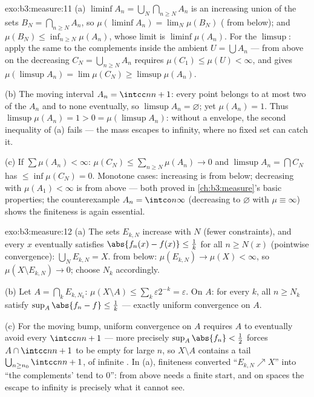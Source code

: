 \begin{solution}{exo:b3:measure:11}
(a) $\liminf A_n = \bigcup_N\bigcap_{n\geq N}A_n$ is an
increasing union of the sets $B_N = \bigcap_{n\geq N}A_n$,
so $\mu(\liminf A_n) = \lim_N\mu(B_N)$ ( from
below); and $\mu(B_N) \leq \inf_{n \geq N}\mu(A_n)$, whose
limit is $\liminf\mu(A_n)$. For the $\limsup$: apply the
same to the complements inside the  ambient
$U = \bigcup A_n$ ---  from above on the
decreasing $C_N = \bigcup_{n\geq N}A_n$ requires $\mu(C_1)
\leq \mu(U) < \infty$, and gives $\mu(\limsup A_n) =
\lim\mu(C_N) \geq \limsup\mu(A_n)$.

(b) The moving interval $A_n = \intcc n{n+1}$: every point
belongs to at most two of the $A_n$ and to none eventually,
so $\limsup A_n = \varnothing$; yet $\mu(A_n) = 1$. Thus
$\limsup\mu(A_n) = 1 > 0 = \mu(\limsup A_n)$: without a
 envelope, the second inequality of (a) fails
--- the mass escapes to infinity, where no fixed set can
catch it.

(c) If $\sum\mu(A_n) < \infty$: $\mu(C_N) \leq
\sum_{n\geq N}\mu(A_n) \to 0$ and $\limsup A_n =
\bigcap C_N$ has  $\leq \inf\mu(C_N) = 0$. Monotone
cases: increasing is  from below; decreasing with
$\mu(A_1) < \infty$ is  from above ---
both proved in \cref{ch:b3:measure}'s basic properties; the
counterexample $A_n = \intco n\infty$ (decreasing to
$\varnothing$ with $\mu \equiv \infty$) shows the finiteness
is again essential.
\end{solution}

\begin{solution}{exo:b3:measure:12}
(a) The sets $E_{k,N}$ increase with $N$ (fewer
constraints), and every $x$ eventually satisfies $\abs{f_n(x)
- f(x)} \leq \frac1k$ for all $n \geq N(x)$ (pointwise
convergence): $\bigcup_NE_{k,N} = X$.  from below:
$\mu(E_{k,N}) \to \mu(X) < \infty$, so $\mu(X\setminus
E_{k,N}) \to 0$; choose $N_k$ accordingly.

(b) Let $A = \bigcap_kE_{k,N_k}$: $\mu(X\setminus A) \leq
\sum_k\varepsilon2^{-k} = \varepsilon$. On $A$: for every
$k$, all $n \geq N_k$ satisfy $\sup_A\abs{f_n - f} \leq
\frac1k$ --- exactly uniform convergence on $A$.

(c) For the moving bump, uniform convergence on $A$ requires
$A$ to eventually avoid every $\intcc n{n+1}$ --- more
precisely $\sup_A\abs{f_n} < \frac12$ forces $A \cap \intcc
n{n+1}$ to be empty for large $n$, so $X \setminus A$
contains a tail $\bigcup_{n\geq n_0}\intcc n{n+1}$, of
infinite . In (a), finiteness converted
``$E_{k,N}\nearrow X$'' into ``the complements' 
tend to $0$'':  from above needs a finite start,
and on  spaces the escape to infinity is
precisely what it cannot see.
\end{solution}

